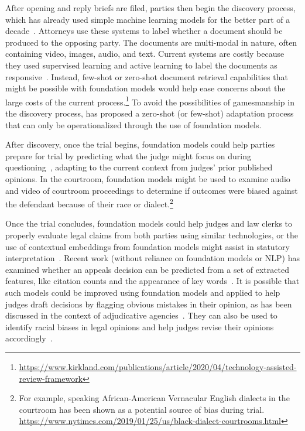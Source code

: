 After opening and reply briefs are filed, parties then begin the discovery process, which has already used simple machine learning models for the better part of a decade~\citep{grossman2010technology}. Attorneys use these systems to label whether a document should be produced to the opposing party. The documents are multi-modal in nature, often containing video, images, audio, and text.
Current systems are costly because they used supervised learning and active learning to label the documents as responsive~\citep{grossman2010technology,oard2018jointly,yang2021goldilocks}. 
Instead, few-shot or zero-shot document retrieval capabilities that might be possible with foundation models would help ease concerns about the large costs of the current process.\footnote{\href{https://www.kirkland.com/publications/article/2020/04/technology-assisted-review-framework}{https://www.kirkland.com/publications/article/2020/04/technology-assisted-review-framework}} To avoid the possibilities of gamesmanship in the discovery process, \citet{cui2018application} has proposed a zero-shot (or few-shot) adaptation process that can only be operationalized through the use of foundation models.

After discovery, once the trial begins, foundation models could help parties prepare for trial by predicting what the judge might focus on during questioning~\citep{dickinson2018computational}, adapting to the current context from judges' prior published opinions. In the courtroom, foundation models might be used to examine audio and video of courtroom proceedings to determine if outcomes were biased against the defendant because of their race or dialect.\footnote{For example, speaking African-American Vernacular English dialects in the courtroom has been shown as a potential source of bias during trial. \url{https://www.nytimes.com/2019/01/25/us/black-dialect-courtrooms.html}}

Once the trial concludes, foundation models could help judges and law clerks to properly evaluate legal claims from both parties using similar technologies, or the use of contextual embeddings from foundation models might assist in statutory interpretation~\citep{nyarko2020statistical,choi2020empirical}. Recent work (without reliance on foundation models or NLP) has examined whether an appeals decision can be predicted from a set of extracted features, like citation counts and the appearance of key words~\citep{katz2017general,boniol2020performance}. It is possible that such models could be improved using foundation models and applied to help judges draft decisions by flagging obvious mistakes in their opinion, as has been discussed in the context of adjudicative agencies~\citep{engstrom2020government,ray2014government}. They can also be used to identify racial biases in legal opinions and help judges revise their opinions accordingly~\citep{rice2019racial}.

